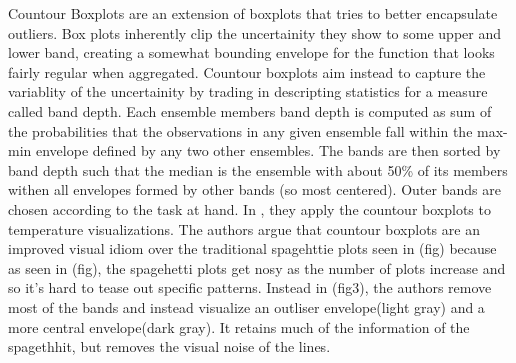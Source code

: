 
Countour Boxplots \cite{Whitaker2013} are an extension of boxplots that tries to better encapsulate outliers. Box plots inherently clip the uncertainity they show to some upper and lower band, 
creating a somewhat bounding envelope for the function that looks fairly regular when aggregated. Countour boxplots aim instead to capture the variablity of the uncertainity by trading in descripting
statistics for a measure called band depth. Each ensemble members band depth is computed as sum of the probabilities that the observations in any given ensemble fall within the max-min envelope defined by any two other ensembles. The bands are then sorted by band depth such that the median is the ensemble with about 50\% of its members withen all envelopes formed by other bands (so most centered). Outer bands are chosen according to the task at hand. In \cite{Whitaker2013}, they apply the countour boxplots to temperature visualizations. %
The authors argue that countour boxplots are an improved visual idiom over the traditional spagehttie plots seen in (fig) because as seen in (fig), the spagehetti plots get nosy as the number of plots increase and so it's hard to tease out specific patterns. Instead in (fig3), the authors remove most of the bands and instead visualize an outliser envelope(light gray) and a more central envelope(dark gray). It retains much of the information of the spagethhit, but removes the visual noise of the lines.  
